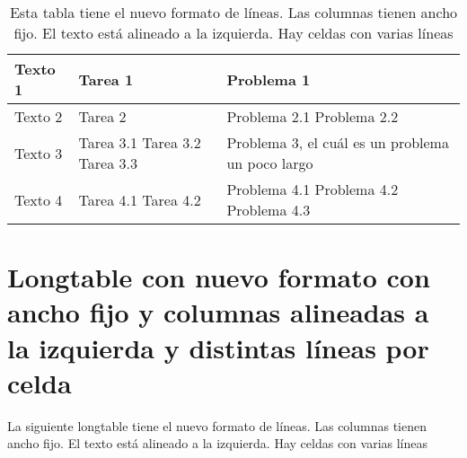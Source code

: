 \begin{table}[h]
	\centering
	\begin{tabular}{>{\raggedright\arraybackslash}p{2cm} >{\raggedright\arraybackslash}p{2.5cm} >{\raggedright\arraybackslash}p{5cm}}
		\toprule[2pt]
		\textbf{Texto 1} & \textbf{Tarea 1} & \textbf{Problema 1} \\
		\midrule[1.5pt]
		Texto 2 & Tarea 2 & Problema 2.1 \newline Problema 2.2 \\
		\hline
		Texto 3 & Tarea 3.1 \newline Tarea 3.2 \newline Tarea 3.3 & Problema 3, el cuál es un problema un poco largo \\
		\hline
		Texto 4 & Tarea 4.1 \newline Tarea 4.2 & Problema 4.1 \newline Problema 4.2 \newline Problema 4.3 \\
		\bottomrule[2pt]
	\end{tabular}
	\caption[Tabla con nuevo formato con ancho fijo y columnas alineadas a la izquierda y distintas líneas por celda]{Esta tabla tiene el nuevo formato de líneas. Las columnas tienen ancho fijo. El texto está alineado a la izquierda. Hay celdas con varias líneas}
	\label{table17}
\end{table}

\section*{Longtable con nuevo formato con ancho fijo y columnas alineadas a la izquierda y distintas líneas por celda}

La siguiente longtable tiene el nuevo formato de líneas. Las columnas tienen ancho fijo. El texto está alineado a la izquierda. Hay celdas con varias líneas

